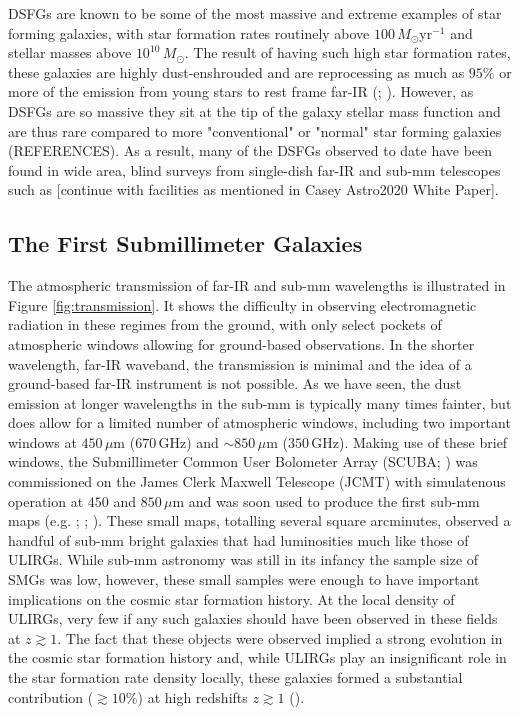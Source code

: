 DSFGs are known to be some of the most massive and extreme examples of star forming galaxies, with star formation rates routinely above $100\,M_\odot$yr$^{-1}$ and stellar masses above $10^{10}\,M_\odot$. The result of having such high star formation rates, these galaxies are highly dust-enshrouded and are reprocessing as much as $95\%$ or more of the emission from young stars to rest frame far-IR (\citealt{Blain_2002}; \citealt{Casey_2014b}). However, as DSFGs are so massive they sit at the tip of the galaxy stellar mass function and are thus rare compared to more "conventional" or "normal" star forming galaxies ({\color{red}REFERENCES}). As a result, many of the DSFGs observed to date have been found in wide area, blind surveys from single-dish far-IR and sub-mm telescopes such as {\color{red}[continue with facilities as mentioned in Casey Astro2020 White Paper]}.

\subsection{The First Submillimeter Galaxies}

The atmospheric transmission of far-IR and sub-mm wavelengths is illustrated in Figure \ref{fig:transmission}. It shows the difficulty in observing electromagnetic radiation in these regimes from the ground, with only select pockets of atmospheric windows allowing for ground-based observations. In the shorter wavelength, far-IR waveband, the transmission is minimal and the idea of a ground-based far-IR instrument is not possible. As we have seen, the dust emission at longer wavelengths in the sub-mm is typically many times fainter, but does allow for a limited number of atmospheric windows, including two important windows at $450\,\mu$m ($670\,$GHz) and $\sim 850\,\mu$m ($350\,$GHz). Making use of these brief windows, the Submillimeter Common User Bolometer Array (SCUBA; \citealt{Holland_1999}) was commissioned on the James Clerk Maxwell Telescope (JCMT) with simulatenous operation at $450$ and $850\,\mu$m and was soon used to produce the first sub-mm maps (e.g. \citealt{Smail_1997}; \citealt{Barger_1998}; \citealt{Hughes_1998}). These small maps, totalling several square arcminutes, observed a handful of sub-mm bright galaxies that had luminosities much like those of ULIRGs. While sub-mm astronomy was still in its infancy the sample size of SMGs was low, however, these small samples were enough to have important implications on the cosmic star formation history. At the local density of ULIRGs, very few if any such galaxies should have been observed in these fields at $z \gtrsim 1$. The fact that these objects were observed implied a strong evolution in the cosmic star formation history and, while ULIRGs play an insignificant role in the star formation rate density locally, these galaxies formed a substantial contribution ($\gtrsim 10\%$) at high redshifts $z \gtrsim 1$ (\citealt{Casey_2014b}). 

